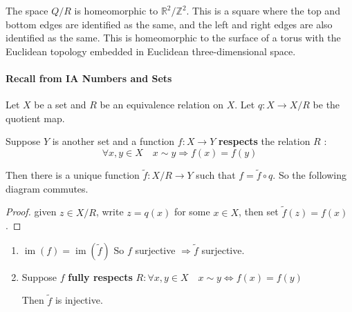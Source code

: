 \documentclass[a4paper]{article}
\begin{document}
\begin{example}
\begin{enumerate}
\begin{center}
\end{center}
The space \( Q / R \) is homeomorphic to \( \mathbb R^2 / \mathbb Z^2 \).
	This is a square where the top and bottom edges are identified as the same, and the left and right edges are also identified as the same.
	This is homeomorphic to the surface of a torus with the Euclidean topology embedded in Euclidean three-dimensional space.
\end{enumerate}
\end{example}

\paragraph{Recall from IA Numbers and Sets }
Let $X$ be a set and $R$ be an equivalence relation on $X$. Let $q: X \rightarrow X / R$ be the quotient map.

Suppose $Y$ is another set and a function $f: X \rightarrow Y$ \textbf{respects} the relation $R$ :
$$
\forall x, y \in X \quad x \sim y \Longrightarrow f(x)=f(y)
$$

Then there is a unique function $\tilde{f}: X / R \rightarrow Y$ such that $f=\tilde{f} \circ q$. So the following diagram commutes. 
\begin{center}
\end{center}
\begin{proof}
    given $z \in X / R$, write $z=q(x)$ for some $x \in X$, then set $\tilde{f}(z)=f(x)$.
\end{proof}

\begin{note}
    \begin{enumerate}
        \item $\operatorname{im}(f)=\operatorname{im}(\tilde{f})$ So $f$ surjective $\Longrightarrow \tilde{f}$ surjective.
      
        \item Suppose $f$ \textbf{fully respects} $R: \forall x, y \in X \quad x \sim y \Longleftrightarrow f(x)=f(y)$
        
        Then $\tilde{f}$ is injective.
      \end{enumerate}
\end{note}
\end{document}

